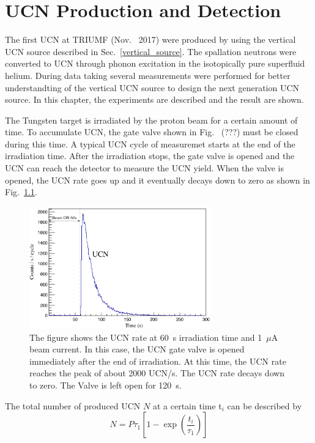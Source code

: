 \chapter{UCN Production and Detection}

The first UCN at TRIUMF (Nov.~ 2017) were produced by using the
vertical UCN source described in Sec.~\ref{vertical_source}. The
spallation neutrons were converted to UCN through phonon excitation in
the isotopically pure superfluid helium.  During data taking several
measurements were performed for better understandting of the vertical
UCN source to design the next generation UCN source. In this chapter,
the experiments are described and the result are shown.

The Tungsten target is irradiated by the proton beam for a certain
amount of time. To accumulate UCN, the gate valve shown in Fig.~ (???)
must be closed during this time. A typical UCN cycle of measuremet
starts at the end of the irradiation time. After the irradiation
stops, the gate valve is opened and the UCN can reach the detector to
measure the UCN yield. When the valve is opened, the UCN rate goes up
and it eventually decays down to zero as shown in Fig.~\ref{fig:UCNRate}.

\begin{figure}[h]
  \centering
  \includegraphics[width=0.7\textwidth]{UCNRate.png}
  \caption{The figure shows the UCN rate at 60~s irradiation time and
    1~$\mu$A beam current. In this case, the UCN gate valve is opened
    immediately after the end of irradiation. At this time, the UCN
    rate reaches the peak of about 2000 UCN/s. The UCN rate decays
    down to zero. The Valve is left open for 120~s. }
  \label{fig:UCNRate}
\end{figure}

The total number of produced UCN $N$ at a certain time t$_i$ can be described by
\begin{equation}
  \label{eq:totalUCN}
  N = P \tau_1\left[ 1- \exp \left(\frac{t_i }{ \tau_1}\right) \right]
\end{equation}

